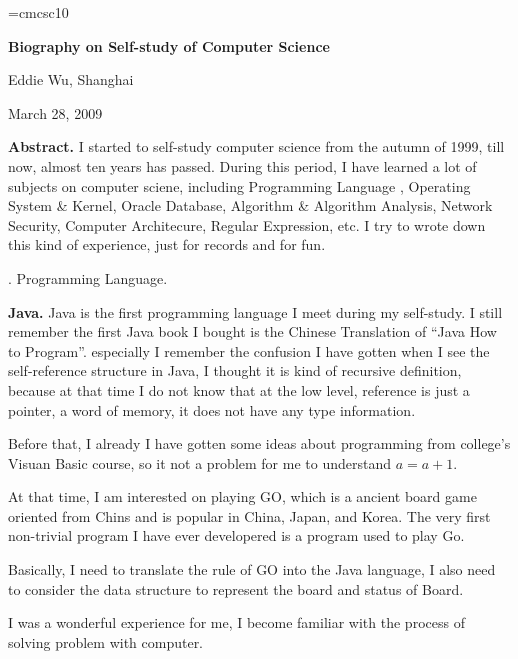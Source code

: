 

\magnification\magstephalf
\parskip3pt
\baselineskip14pt
\def\AW{Addison\kern.1em--Wesley}
\font\sc=cmcsc10 %


\centerline{\bf Biography on Self-study of Computer Science}
\bigskip
\centerline{Eddie Wu, Shanghai}
\bigskip
\centerline{March 28, 2009}
\bigskip
{
\baselineskip12pt

{\narrower\smallskip\noindent
{\bf Abstract.} I started to self-study computer science from the autumn of 
1999, till now, almost ten years has passed. During this period, I have
learned a lot of subjects on computer sciene, including 
Programming Language%
, Operating System \& Kernel, Oracle Database, Algorithm \& Algorithm Analysis,
 Network Security, Computer Architecure, Regular Expression, etc. I try to wrote 
 down this kind of experience, just for records and for fun.
\smallskip}

}



{}. Programming Language.

{\bf Java.} Java is the first programming language I meet during my self-study. I still 
remember the first Java book I bought is the Chinese Translation of ``Java How 
to Program''. especially I remember the confusion I have gotten when I see the 
self-reference structure in Java, I thought it is kind of recursive definition, 
because at that time I do not know that at 
the low level, reference is just a pointer, a word of memory, it does not have 
any type information. 

Before that, I already I have gotten some ideas about programming from college's 
Visuan Basic course, so it not a problem for me to understand $a=a+1$.

At that time, I am interested on playing GO, which is a ancient board game 
oriented from Chins and is popular in China, Japan, and Korea. The very first 
non-trivial program I have ever developered is a program used to play Go.

Basically, I need to translate the rule of GO into the Java language, I also 
need to consider the data structure to represent the board and status of Board.

I was a wonderful experience for me, I become familiar with the process of 
solving problem with computer.

